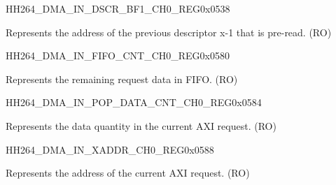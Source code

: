     
    \begin{register}{H}{H264\_DMA\_IN\_DSCR\_BF1\_CH0\_REG}{0x0538}\label{regdesc:H264DMAINDSCRBF1CH0REG}
    \regnewline%
    \begin{regdesc}\begin{reglist}
    \label{fielddesc:H264DMAINLINKDSCRBF1CH0}\item [H264\_DMA\_INLINK\_DSCR\_BF1\_CH0] Represents the address of the previous descriptor x-1 that is pre-read. (RO)
    \end{reglist}\end{regdesc}
    \end{register}
    
    \begin{register}{H}{H264\_DMA\_IN\_FIFO\_CNT\_CH0\_REG}{0x0580}\label{regdesc:H264DMAINFIFOCNTCH0REG}
    \regnewline%
    \begin{regdesc}\begin{reglist}
    \label{fielddesc:H264DMAINCMDFIFOINFIFOCNTCH0}\item [H264\_DMA\_IN\_CMDFIFO\_INFIFO\_CNT\_CH0] Represents the remaining request data in FIFO. (RO)
    \end{reglist}\end{regdesc}
    \end{register}
    
    
    \begin{register}{H}{H264\_DMA\_IN\_POP\_DATA\_CNT\_CH0\_REG}{0x0584}\label{regdesc:H264DMAINPOPDATACNTCH0REG}
    \regnewline%
    \begin{regdesc}\begin{reglist}
    \label{fielddesc:H264DMAINCMDFIFOPOPDATACNTCH0}\item [H264\_DMA\_IN\_CMDFIFO\_POP\_DATA\_CNT\_CH0] Represents the data quantity in the current AXI request. (RO)
    \end{reglist}\end{regdesc}
    \end{register}
    
    
    \begin{register}{H}{H264\_DMA\_IN\_XADDR\_CH0\_REG}{0x0588}\label{regdesc:H264DMAINXADDRCH0REG}
    \regnewline%
    \begin{regdesc}\begin{reglist}
    \label{fielddesc:H264DMAINCMDFIFOXADDRCH0}\item [H264\_DMA\_IN\_CMDFIFO\_XADDR\_CH0] Represents the address of the current AXI request. (RO)
    \end{reglist}\end{regdesc}
    \end{register}
    
